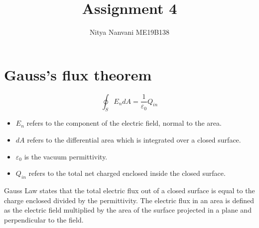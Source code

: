 \title{Assignment 4}
\author{Nitya Nanvani ME19B138}

\maketitle

\section{Gauss's flux theorem}

\begin{equation}
    \oint_S {E_n dA = \frac{1}{{\varepsilon _0 }}} Q_{in}
\end{equation}

\begin{itemize}
	\item $ E_n $  refers to the component of the electric field, normal to the area.
	\item $ dA $  refers to the differential area which is integrated over a closed surface.
	\item $ \varepsilon _0 $ is the vacuum permittivity.
	\item $ Q_{in} $ refers to the total net charged enclosed inside the closed surface.
\end{itemize}
Gauss Law states that the total electric flux out of a closed surface is equal to the charge enclosed divided by the permittivity. The electric flux in an area is defined as the electric field multiplied by the area of the surface projected in a plane and perpendicular to the field.
